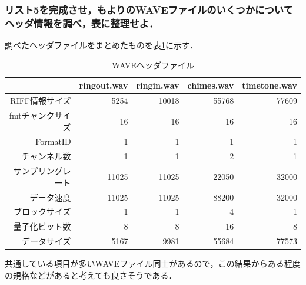 \documentclass[titlepage]{jarticle}
\begin{document}
\subsubsection{リスト5を完成させ，もよりのWAVEファイルのいくつかについてヘッダ情報を調べ，表に整理せよ．}
調べたヘッダファイルをまとめたものを表\ref{wave_header}に示す．
\begin{table}[H]
  \caption{WAVEヘッダファイル}
  \label{wave_header}
  \centering
  \begin{tabular}{r|rrrr}\hline
                       & ringout.wav & ringin.wav & chimes.wav & timetone.wav \\\hline\hline
    RIFF情報サイズ     & 5254        & 10018      & 55768      & 77609        \\
    fmtチャンクサイズ  & 16          & 16         & 16         & 16           \\
    FormatID           & 1           & 1          & 1          & 1            \\
    チャンネル数       & 1           & 1          & 2          & 1            \\
    サンプリングレート & 11025       & 11025      & 22050      & 32000        \\
    データ速度         & 11025       & 11025      & 88200      & 32000        \\
    ブロックサイズ     & 1           & 1          & 4          & 1            \\
    量子化ビット数     & 8           & 8          & 16         & 8            \\
    データサイズ       & 5167        & 9981       & 55684      & 77573        \\\hline
  \end{tabular}
\end{table}

共通している項目が多いWAVEファイル同士があるので，この結果からある程度の規格などがあると考えても良さそうである．
\end{document}
